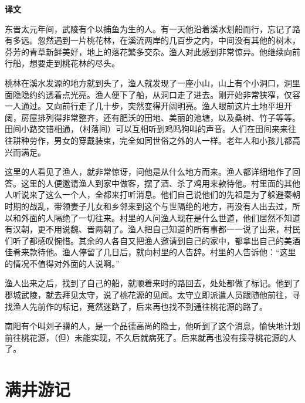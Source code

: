 \documentclass[12pt,UTF-8,openany,a4]{ctexbook}
\begin{document}
\newpage

\begin{Large}
    \noindent\textbf{译文}
\end{Large}


\vspace{1em}

\begin{large}
    \yiwen 
    东晋太元年间，武陵有个以捕鱼为生的人。有一天他沿着溪水划船而行，忘记了路有多远。忽然遇到一片桃花林，在溪流两岸的几百步之内，中间没有其他的树木， 芬芳的青草新鲜美好，地上的落花繁多交杂。渔人对此感到非常惊异。他继续向前行船，想要走到桃花林的尽头。
    
    桃林在溪水发源的地方就到头了，渔人就发现了一座小山，山上有个小洞口，洞里面隐隐约约透着点光亮。渔人便下了船，从洞口走了进去。刚开始非常狭窄，仅容一人通过。又向前行走了几十步，突然变得开阔明亮。渔人眼前这片土地平坦开阔，房屋排列得非常整齐，还有肥沃的田地、美丽的池塘，以及桑树、竹子等等。田间小路交错相通，（村落间）可以互相听到鸡鸣狗叫的声音。人们在田间来来往往耕种劳作，男女的穿戴装束，完全如同世俗之外的人一样。老年人和小孩儿都高兴而满足。
    
    这里的人看见了渔人，就非常惊讶，问他是从什么地方而来。渔人都详细地作了回答。这里的人便邀请渔人到家中做客，摆了酒、杀了鸡用来款待他。村里面的其他人听说来了这么一个人，全都来打听消息。他们自己说他们的先祖是为了躲避秦朝时期的战乱，带领妻子儿女和乡邻来到这个与世隔绝的地方，再没有人出去过，所以和外面的人隔绝了一切往来。村里的人问渔人现在是什么世道，他们居然不知道有汉朝，更不用说魏、晋两朝了。渔人把自己知道的所有事都一一说了出来，村民们听了都感叹惋惜。其余的人各自又把渔人邀请到自己的家中，都拿出自己的美酒佳肴来款待他。渔人停留了几日后，就向村里的人告辞。村里的人告诉他：“这里的情况不值得对外面的人说啊。”
    
    渔人出来之后，找到了自己的船，就顺着来时的路回去，处处都做了标记。他到了郡城武陵，就去拜见太守，说了桃花源的见闻。太守立即派遣人员跟随他前往，寻找渔人先前作的标记，竟然迷路了，后来再也找不到通往桃花源的路了。
    
    南阳有个叫刘子骥的人，是一个品德高尚的隐士，他听到了这个消息，愉快地计划前往桃花源，（但）未能实现，不久后就病死了。后来就再也没有探寻桃花源的人了。
    
\end{large}



\chapter{满井游记}
\end{document}
